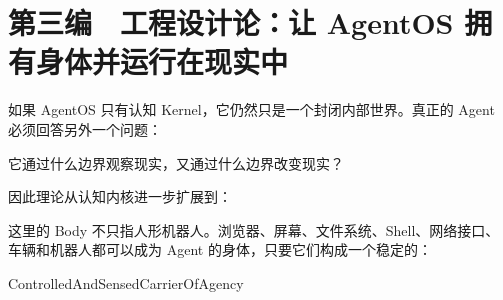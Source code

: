 








































\part{第三编　工程设计论：让 AgentOS 拥有身体并运行在现实中}
如果 AgentOS 只有认知 Kernel，它仍然只是一个封闭内部世界。真正的 Agent 必须回答另外一个问题：

\begin{statementbox}
它通过什么边界观察现实，又通过什么边界改变现实？
\end{statementbox}

因此理论从认知内核进一步扩展到：

\begin{statementbox}
\centering
{}
\end{statementbox}

这里的 Body 不只指人形机器人。浏览器、屏幕、文件系统、Shell、网络接口、车辆和机器人都可以成为 Agent 的身体，只要它们构成一个稳定的：

\begin{statementbox}
ControlledAndSensedCarrierOfAgency
\end{statementbox}

